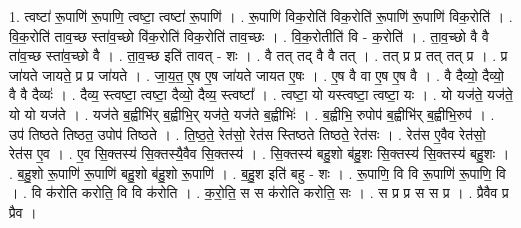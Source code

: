 \documentclass[17pt]{extarticle}
\begin{document}
1. त्वष्टा॑ रू॒पाणि॑ रू॒पाणि॒ त्वष्टा॒ त्वष्टा॑ रू॒पाणि॑ । . रू॒पाणि॑ विक॒रोति॑ विक॒रोति॑ रू॒पाणि॑ रू॒पाणि॑ विक॒रोति॑ । . वि॒क॒रोति॑ ताव॒च्छ स्ता॑व॒च्छो वि॑क॒रोति॑ विक॒रोति॑ ताव॒च्छः । . वि॒क॒रोतीति॑ वि - क॒रोति॑ । . ता॒व॒च्छो वै वै ता॑व॒च्छ स्ता॑व॒च्छो वै । . ता॒व॒च्छ इति॑ तावत् - शः । . वै तत् तद् वै वै तत् । . तत् प्र प्र तत् तत् प्र । . प्र जा॑यते जायते॒ प्र प्र जा॑यते । . जा॒य॒त॒ ए॒ष ए॒ष जा॑यते जायत ए॒षः । . ए॒ष वै वा ए॒ष ए॒ष वै । . वै दैव्यो॒ दैव्यो॒ वै वै दैव्यः॑ । . दैव्य॒ स्त्वष्टा॒ त्वष्टा॒ दैव्यो॒ दैव्य॒ स्त्वष्टा᳚ । . त्वष्टा॒ यो यस्त्वष्टा॒ त्वष्टा॒ यः । . यो यज॑ते॒ यज॑ते॒ यो यो यज॑ते । . यज॑ते ब॒ह्वीभि॑र् ब॒ह्वीभि॒र् यज॑ते॒ यज॑ते ब॒ह्वीभिः॑ । . ब॒ह्वीभि॒ रुपोप॑ ब॒ह्वीभि॑र् ब॒ह्वीभि॒रुप॑ । . उप॑ तिष्ठते तिष्ठत॒ उपोप॑ तिष्ठते । . ति॒ष्ठ॒ते॒ रेत॑सो॒ रेत॑स स्तिष्ठते तिष्ठते॒ रेत॑सः । . रेत॑स ए॒वैव रेत॑सो॒ रेत॑स ए॒व । . ए॒व सि॒क्तस्य॑ सि॒क्तस्यै॒वैव सि॒क्तस्य॑ । . सि॒क्तस्य॑ बहु॒शो ब॑हु॒शः सि॒क्तस्य॑ सि॒क्तस्य॑ बहु॒शः । . ब॒हु॒शो रू॒पाणि॑ रू॒पाणि॑ बहु॒शो ब॑हु॒शो रू॒पाणि॑ । . ब॒हु॒श इति॑ बहु - शः । . रू॒पाणि॒ वि वि रू॒पाणि॑ रू॒पाणि॒ वि । . वि क॑रोति करोति॒ वि वि क॑रोति । . क॒रो॒ति॒ स स क॑रोति करोति॒ सः । . स प्र प्र स स प्र । . प्रैवैव प्र प्रैव । \newline
\end{document}
